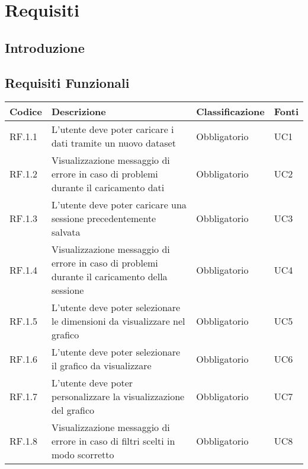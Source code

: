 \chapter{Requisiti}



\section{Introduzione}
\section{Requisiti Funzionali}
\begin{table}[H]
  \centering
  \begin{tabular}{|p{}|p{6cm}|p{3cm}|p{2cm}|}
    \hline
    \rowcolor[HTML]{036400}
    {\color[HTML]{FFFFFF} \textbf{Codice}} & {\color[HTML]{FFFFFF} \textbf{Descrizione}} & {\color[HTML]{FFFFFF} \textbf{Classificazione}} & {\color[HTML]{FFFFFF} \textbf{Fonti}} \\ \hline
    \rowcolor[HTML]{EFEFEF}
    RF.1.1 & L'utente deve poter caricare i dati tramite un nuovo dataset & Obbligatorio & UC1 \\ \hline
    \rowcolor[HTML]{C0C0C0}
    RF.1.2 & Visualizzazione messaggio di errore in caso di problemi durante il caricamento dati & Obbligatorio & UC2 \\ \hline
    \rowcolor[HTML]{EFEFEF}
    RF.1.3 & L'utente deve poter caricare una sessione precedentemente salvata & Obbligatorio & UC3 \\ \hline
    \rowcolor[HTML]{C0C0C0}
    RF.1.4 & Visualizzazione messaggio di errore in caso di problemi durante il caricamento della sessione & Obbligatorio & UC4 \\ \hline
    \rowcolor[HTML]{EFEFEF}
    RF.1.5 & L'utente deve poter selezionare le dimensioni da visualizzare nel grafico & Obbligatorio & UC5 \\ \hline
    \rowcolor[HTML]{C0C0C0}
    RF.1.6 & L'utente deve poter selezionare il grafico da visualizzare & Obbligatorio & UC6 \\ \hline
    \rowcolor[HTML]{EFEFEF}
    RF.1.7 & L'utente deve poter personalizzare la visualizzazione del grafico & Obbligatorio & UC7 \\ \hline
    \rowcolor[HTML]{C0C0C0}
    RF.1.8 & Visualizzazione messaggio di errore in caso di filtri scelti in modo scorretto & Obbligatorio & UC8 \\ \hline

\end{tabular}
\end{table}
